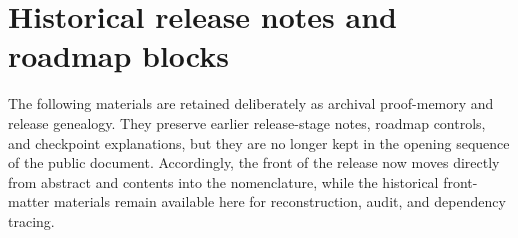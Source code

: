 \section*{Historical release notes and roadmap blocks}
The following materials are retained deliberately as archival proof-memory and release genealogy.
They preserve earlier release-stage notes, roadmap controls, and checkpoint explanations, but they are no longer kept in the opening sequence of the public document.
Accordingly, the front of the release now moves directly from abstract and contents into the nomenclature, while the historical front-matter materials remain available here for reconstruction, audit, and dependency tracing.

